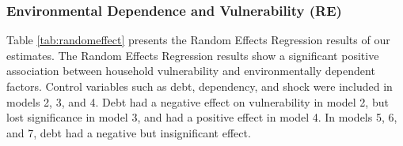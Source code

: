 \subsubsection{Environmental Dependence and Vulnerability (RE)}
Table \ref{tab:randomeffect} presents the Random Effects Regression results of our estimates. The Random Effects Regression results show a significant positive association between household vulnerability and environmentally dependent factors. Control variables such as debt, dependency, and shock were included in models 2, 3, and 4. Debt had a negative effect on vulnerability in model 2, but lost significance in model 3, and had a positive effect in model 4. In models 5, 6, and 7, debt had a negative but insignificant effect.

\begin{table}[htb] 
	\caption{Random Effects Regression} 
	\renewcommand{\arraystretch}{1.5}
\end{table}
